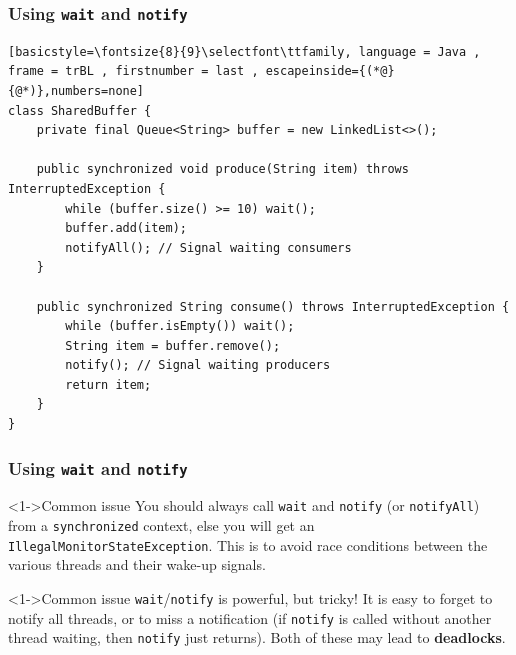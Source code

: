 \documentclass[xcolor={dvipsnames,svgnames},aspectratio=169]{beamer}
\begin{document}
\begin{frame}[fragile]
  \frametitle{Using \texttt{wait} and \texttt{notify}}
\begin{lstlisting}[basicstyle=\fontsize{8}{9}\selectfont\ttfamily, language = Java ,
frame = trBL , firstnumber = last , escapeinside={(*@}{@*)},numbers=none]
class SharedBuffer {
    private final Queue<String> buffer = new LinkedList<>();

    public synchronized void produce(String item) throws InterruptedException {
        while (buffer.size() >= 10) wait();
        buffer.add(item);
        notifyAll(); // Signal waiting consumers
    }

    public synchronized String consume() throws InterruptedException {
        while (buffer.isEmpty()) wait();
        String item = buffer.remove();
        notify(); // Signal waiting producers
        return item;
    }
}\end{lstlisting}
\end{frame}

\begin{frame}[fragile]
  \frametitle{Using \texttt{wait} and \texttt{notify}}
  \begin{block}<1->{\faExclamationTriangle \quad Common issue}
    You should always call \texttt{wait} and \texttt{notify} (or
    \texttt{notifyAll}) from a \texttt{synchronized} context, else you will get
    an \texttt{IllegalMonitorStateException}. This is to avoid race conditions
    between the various threads and their wake-up signals.
  \end{block}
  \vspace{0.4cm}
  \begin{block}<1->{\faExclamationTriangle \quad Common issue}
    \texttt{wait}/\texttt{notify} is powerful, but tricky! It is easy to
    forget to notify all threads, or to miss a notification (if \texttt{notify} is
    called without another thread waiting, then \texttt{notify} just returns).
    Both of these may lead to \textbf{deadlocks}.
  \end{block}
\end{frame}
\end{document}
